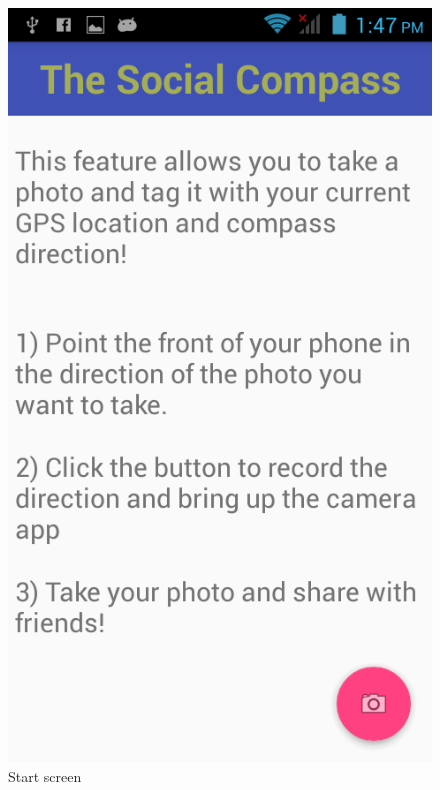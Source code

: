 \documentclass[12pt]{article}
\begin{document}
\begin{figure}[!htb]
    \centering
    \begin{minipage}[b]{.3\textwidth} 
        \centering  
        \includegraphics[scale=1.2, width=\linewidth]{photo1.png}     
        \caption{Start screen}  
    \end{minipage}    
    \hfill
    \begin{minipage}[b]{.3\textwidth}  
        \centering  

\end{minipage}
\end{figure}
\end{document}
